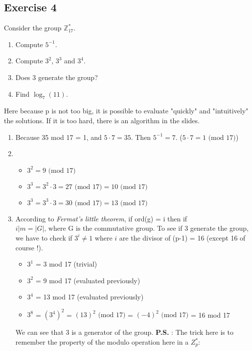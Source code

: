 \subsection{Exercise 4}
Consider the group $\mathbb{Z}^{\ast}_{17}$.
\begin{enumerate}
\item Compute $5^{-1}$.
\item Compute $3^2$, $3^3$ and $3^4$.
\item Does $3$ generate the group?
\item Find $\log_{7}(11)$.
\end{enumerate}
\begin{solution}
Here because p is not too big, it is possible to evaluate "quickly" and "intuitively" the solutions. If it is too hard, there is an algorithm in the slides. 
\begin{enumerate}
    \item Because 35 mod 17 = 1, and $5 \cdot 7 = 35$. \newline Then $5^{-1} = 7$.  ($5 \cdot 7 = 1 \text{ (mod 17)}$)
    \item \begin{itemize}
        \item $3^2 = 9 \text{ (mod 17)}$
        \item $3^3 = 3^2 \cdot 3 = 27 \text{ (mod 17)} = 10 \text{ (mod 17)}$
        \item $3^3 = 3^3 \cdot 3 = 30 \text{ (mod 17)} = 13 \text{ (mod 17)}$
    \end{itemize}
    \item According to \textit{Fermat's little theorem}, if ord(g) = i then if $i|m = |G| \text{, where G is the commutative group}$. To see if 3 generate the group, we have to check if $3^i \neq 1$ where $i$ are the divisor of (p-1) = 16 (except 16 of course !).
    \begin{itemize}
        \item $3^1$ = 3 mod 17 (trivial)
        \item $3^2$ = 9 mod 17 (evaluated previously)
        \item $3^4$ = 13 mod 17 (evaluated previously)
        \item $3^8$ = $(3^4)^2$ = $(13)^2 \text{ (mod 17)}$ = $(-4)^2 \text{ (mod 17)}$ = 16 mod 17
    \end{itemize}
    We can see that 3 is a generator of the group. \newline \newline
    \textbf{P.S.} : The trick here is to remember the property of the modulo operation here in a $Z^*_p$:

\end{enumerate}
\end{solution}
